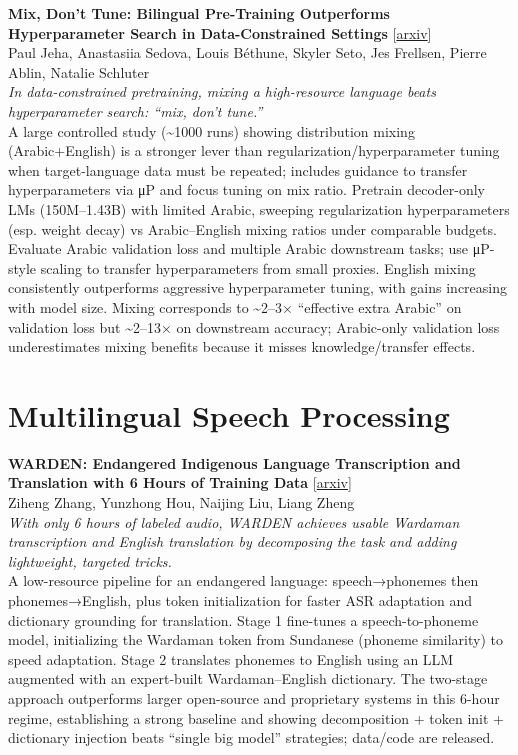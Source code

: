 \documentclass[12pt,letterpaper]{article}
\begin{document}
\medskip

{\small\textbf{Mix, Don't Tune: Bilingual Pre-Training Outperforms Hyperparameter Search in Data-Constrained Settings}} {\scriptsize[\href{https://arxiv.org/abs/2605.13225}{arxiv}]}\\
{\scriptsize Paul Jeha, Anastasiia Sedova, Louis B\'ethune, Skyler Seto, Jes Frellsen, Pierre Ablin, Natalie Schluter}\\

{\small\textit{In data-constrained pretraining, mixing a high-resource language beats hyperparameter search: ``mix, don't tune.''}}\\[1pt]
{\footnotesize A large controlled study (\textasciitilde{}1000 runs) showing distribution mixing (Arabic+English) is a stronger lever than regularization/hyperparameter tuning when target-language data must be repeated; includes guidance to transfer hyperparameters via μP and focus tuning on mix ratio. Pretrain decoder-only LMs (150M--1.43B) with limited Arabic, sweeping regularization hyperparameters (esp. weight decay) vs Arabic--English mixing ratios under comparable budgets. Evaluate Arabic validation loss and multiple Arabic downstream tasks; use μP-style scaling to transfer hyperparameters from small proxies. English mixing consistently outperforms aggressive hyperparameter tuning, with gains increasing with model size. Mixing corresponds to \textasciitilde{}2--3× ``effective extra Arabic'' on validation loss but \textasciitilde{}2--13× on downstream accuracy; Arabic-only validation loss underestimates mixing benefits because it misses knowledge/transfer effects.}

\medskip


\section*{Multilingual Speech Processing}

{\small\textbf{WARDEN: Endangered Indigenous Language Transcription and Translation with 6 Hours of Training Data}} {\scriptsize[\href{https://arxiv.org/abs/2605.13846}{arxiv}]}\\
{\scriptsize Ziheng Zhang, Yunzhong Hou, Naijing Liu, Liang Zheng}\\

{\small\textit{With only 6 hours of labeled audio, WARDEN achieves usable Wardaman transcription and English translation by decomposing the task and adding lightweight, targeted tricks.}}\\[1pt]
{\footnotesize A low-resource pipeline for an endangered language: speech→phonemes then phonemes→English, plus token initialization for faster ASR adaptation and dictionary grounding for translation. Stage 1 fine-tunes a speech-to-phoneme model, initializing the Wardaman token from Sundanese (phoneme similarity) to speed adaptation. Stage 2 translates phonemes to English using an LLM augmented with an expert-built Wardaman--English dictionary. The two-stage approach outperforms larger open-source and proprietary systems in this 6-hour regime, establishing a strong baseline and showing decomposition + token init + dictionary injection beats ``single big model'' strategies; data/code are released.}
\end{document}
